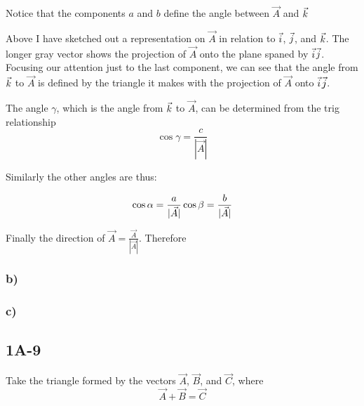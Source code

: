 \documentclass[main.tex]{subfiles}
\begin{document}
Notice that the components $a$ and $b$ define the angle between $\vec
{A}$ and $\vec{k}$

Above I have sketched out a representation on $\vec{A}$ in relation
to {\color{i}$\vec{i}$}, {\color{j}$\vec{j}$}, and {\color{k}$\vec{k}$}.
The longer gray vector shows the projection of $\vec{A}$ onto the
plane spaned by {\color{i}$\vec{i}$}{\color{j}$\vec{j}$}.
Focusing our attention just to the last component, we can see that
the angle from {\color{k}$\vec{k}$} to $\vec{A}$
is defined by the triangle it makes with the projection of $\vec{A}$
onto {\color{i}$\vec{i}$}{\color{j}$\vec{j}$}.

The angle $\gamma$, which is the angle from {\color{k}$\vec{k}$} to $\vec{A}$,
can be determined from the trig relationship
\begin{equation*}
\cos{\gamma} = \frac{c}{|\vec{A}|}
\end{equation*}

Similarly the other angles are thus:

\begin{equation*}
\cos{\alpha} = \frac{a}{|\vec{A}|}\\
\cos{\beta} = \frac{b}{|\vec{A}|}
\end{equation*}

Finally the direction of $\vec{A} = \frac{\vec{A}}{|\vec{A}|}$.
Therefore

\subsubsection*{b)}

\subsubsection*{c)}


\subsection*{1A-9}

Take the triangle formed by the vectors $\vec{A}$, $\vec{B}$, and $
\vec{C}$, where
\begin{equation*}
\vec{A} + \vec{B} = \vec{C}
\end{equation*}
\end{document}
